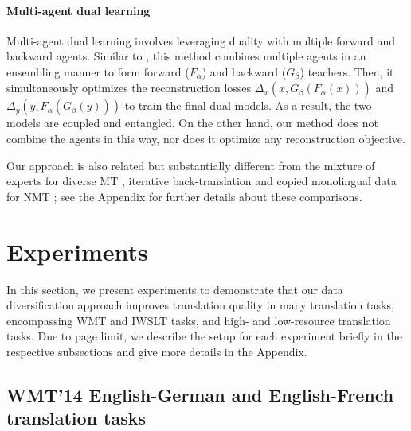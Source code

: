 \documentclass{article}
\begin{document}
\vspace{-0.5em}
\paragraph{Multi-agent dual learning} Multi-agent dual learning \citep{multiagent} involves leveraging duality with multiple forward and backward agents. Similar to \citep{ensemble_distill_freitag2017}, this method combines multiple agents in an ensembling manner to form forward ($F_{\alpha}$) and backward ($G_{\beta}$) teachers. Then, it simultaneously optimizes the reconstruction losses $\Delta_x(x,G_{\beta}(F_{\alpha}(x)))$ and $\Delta_y(y,F_{\alpha}(G_{\beta}(y)))$ to train the final dual models. As a result, the two models are coupled and entangled. On the other hand, our method does not combine the agents in this way, nor does it optimize any reconstruction objective.

Our approach is also related but substantially different from the mixture of experts for diverse MT \citep{mixture_model_nmt_shen2019}, iterative back-translation \citep{iterative-hoang-etal-2018} and copied monolingual data for NMT \citep{copied-currey-etal-2017}; 
see the Appendix for further details about these comparisons.


 \label{sec:data-diver}

\section{Experiments} \label{sec:experiments}
In this section, we present experiments to demonstrate that our data diversification approach improves translation quality in many translation tasks, encompassing WMT and IWSLT tasks, and high- and low-resource translation tasks. {Due to page limit, we  describe the setup for each experiment briefly in the respective subsections and give more details in the Appendix.} 



\subsection{WMT'14 English-German and English-French translation tasks}\label{sec:wmt}
\end{document}

